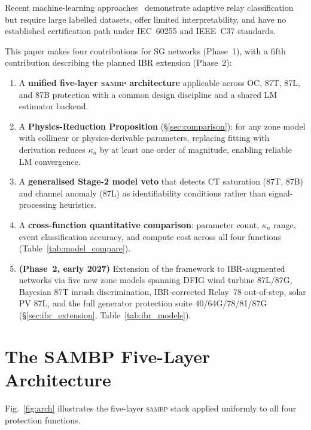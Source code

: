 \documentclass[journal,twoside,10pt]{IEEEtran}
\begin{document}
Recent machine-learning approaches~\cite{Sheikhzadeh2022,Gao2023} demonstrate
adaptive relay classification but require large labelled datasets, offer
limited interpretability, and have no established certification path
under IEC~60255 and IEEE~C37 standards.

This paper makes four contributions for SG networks (Phase~1), with a
fifth contribution describing the planned IBR extension (Phase~2):

\begin{enumerate}
  \item A \textbf{unified five-layer \textsc{sambp} architecture} applicable
        across OC, 87T, 87L, and 87B protection with a common design
        discipline and a shared LM estimator backend.
  \item A \textbf{Physics-Reduction Proposition} (§\ref{sec:comparison}):
        for any zone model with collinear or physics-derivable parameters,
        replacing fitting with derivation reduces $\kappa_n$ by at least
        one order of magnitude, enabling reliable LM convergence.
  \item A \textbf{generalised Stage-2 model veto} that detects CT
        saturation (87T, 87B) and channel anomaly (87L) as identifiability
        conditions rather than signal-processing heuristics.
  \item A \textbf{cross-function quantitative comparison}: parameter count,
        $\kappa_n$ range, event classification accuracy, and compute cost
        across all four functions (Table~\ref{tab:model_compare}).
  \item \textbf{(Phase~2, early 2027)} Extension of the framework to
        IBR-augmented networks via five new zone models spanning DFIG
        wind turbine 87L/87G, Bayesian 87T inrush discrimination,
        IBR-corrected Relay~78 out-of-step, solar PV 87L, and the full
        generator protection suite 40/64G/78/81/87G
        (§\ref{sec:ibr_extension}, Table~\ref{tab:ibr_models}).
\end{enumerate}

\section{The SAMBP Five-Layer Architecture}
\label{sec:arch}

Fig.~\ref{fig:arch} illustrates the five-layer \textsc{sambp} stack applied
uniformly to all four protection functions.
\end{document}
